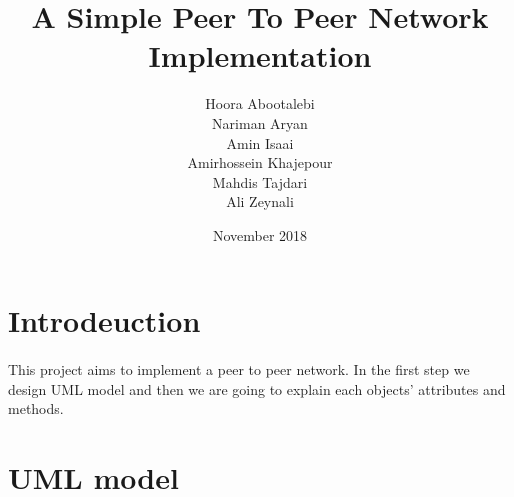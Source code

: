 \documentclass{article}
\title{A Simple Peer To Peer Network Implementation}
\author{Hoora Abootalebi\\Nariman Aryan\\Amin Isaai\\Amirhossein Khajepour\\Mahdis Tajdari\\Ali Zeynali}
\date{ November 2018}
\begin{document}
\large
\maketitle
\clearpage
\tableofcontents
\clearpage
\section{Introdeuction}
\paragraph{}This project aims to implement a peer to peer network. In the first step we design UML model and then we are going to explain each objects' attributes and methods.
\section{UML model}
\end{document}
